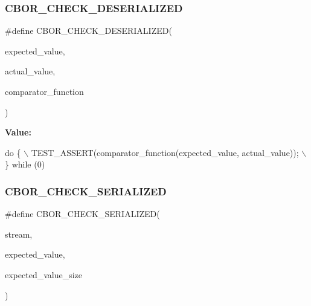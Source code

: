 \subsubsection{\texorpdfstring{C\+B\+O\+R\+\_\+\+C\+H\+E\+C\+K\+\_\+\+D\+E\+S\+E\+R\+I\+A\+L\+I\+Z\+ED}{CBOR\_CHECK\_DESERIALIZED}}
{\footnotesize\ttfamily \#define C\+B\+O\+R\+\_\+\+C\+H\+E\+C\+K\+\_\+\+D\+E\+S\+E\+R\+I\+A\+L\+I\+Z\+ED(\begin{DoxyParamCaption}\item[{}]{expected\+\_\+value,  }\item[{}]{actual\+\_\+value,  }\item[{}]{comparator\+\_\+function }\end{DoxyParamCaption})}

{\bfseries Value\+:}
\begin{DoxyCode}
\textcolor{keywordflow}{do} \{ \(\backslash\)
    TEST\_ASSERT(comparator\_function(expected\_value, actual\_value)); \(\backslash\)
\} \textcolor{keywordflow}{while} (0)
\end{DoxyCode}
\mbox{\label{tests-cbor_8c_aee25eb17d0e99fde14dda9e45fb6d111}} 
\subsubsection{\texorpdfstring{C\+B\+O\+R\+\_\+\+C\+H\+E\+C\+K\+\_\+\+S\+E\+R\+I\+A\+L\+I\+Z\+ED}{CBOR\_CHECK\_SERIALIZED}}
{\footnotesize\ttfamily \#define C\+B\+O\+R\+\_\+\+C\+H\+E\+C\+K\+\_\+\+S\+E\+R\+I\+A\+L\+I\+Z\+ED(\begin{DoxyParamCaption}\item[{}]{stream,  }\item[{}]{expected\+\_\+value,  }\item[{}]{expected\+\_\+value\+\_\+size }\end{DoxyParamCaption})}

